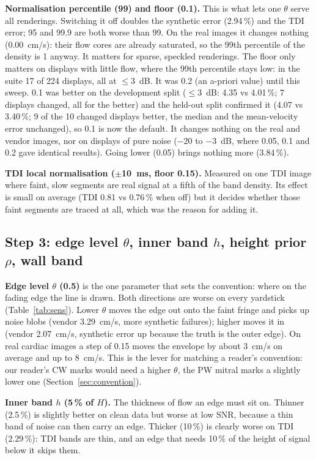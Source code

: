 \documentclass[11pt,a4paper]{article}
\begin{document}
\textbf{Normalisation percentile (99) and floor (0.1).} This is what lets one $\theta$ serve all renderings. Switching
it off doubles the synthetic error (2.94\,\%) and the TDI error; 95 and 99.9 are both worse than 99. On the real images
it changes nothing (0.00~cm/s): their flow cores are already saturated, so the 99th percentile of the density is 1
anyway. It matters for sparse, speckled renderings. The floor only matters on displays with little flow, where the
99th percentile stays low: in the suite 17 of 224 displays, all at $\le$3~dB. It was 0.2 (an a-priori value) until
this sweep. 0.1 was better on the development split ($\le$3~dB: 4.35 vs 4.01\,\%; 7 displays changed, all for the
better) and the held-out split confirmed it (4.07 vs 3.40\,\%; 9 of the 10 changed displays better, the median and
the mean-velocity error unchanged), so 0.1 is now the default. It changes nothing on the real and vendor images, nor
on displays of pure noise ($-20$ to $-3$~dB, where 0.05, 0.1 and 0.2 gave identical results). Going lower (0.05)
brings nothing more (3.84\,\%).

\textbf{TDI local normalisation ($\pm$10~ms, floor 0.15).} Measured on one TDI image where faint, slow segments are real
signal at a fifth of the band density. Its effect is small on average (TDI 0.81 vs 0.76\,\% when off) but it decides
whether those faint segments are traced at all, which was the reason for adding it.

\subsection{Step 3: edge level $\theta$, inner band $h$, height prior $\rho$, wall band}
\textbf{Edge level $\theta$ (0.5)} is the one parameter that sets the convention: where on the fading edge the line is
drawn. Both directions are worse on every yardstick (Table~\ref{tab:sens}). Lower $\theta$ moves the edge out onto the
faint fringe and picks up noise blobs (vendor 3.29~cm/s, more synthetic failures); higher moves it in (vendor
2.07~cm/s, synthetic error up because the truth is the outer edge). On real cardiac images a step of 0.15 moves the
envelope by about 3~cm/s on average and up to 8~cm/s. This is the lever for matching a reader's convention: our
reader's CW marks would need a higher $\theta$, the PW mitral marks a slightly lower one (Section~\ref{sec:convention}).

\textbf{Inner band $h$ (5\,\% of $H$).} The thickness of flow an edge must sit on. Thinner (2.5\,\%) is slightly better
on clean data but worse at low SNR, because a thin band of noise can then carry an edge. Thicker (10\,\%) is clearly
worse on TDI (2.29\,\%): TDI bands are thin, and an edge that needs 10\,\% of the height of signal below it skips
them.
\end{document}
